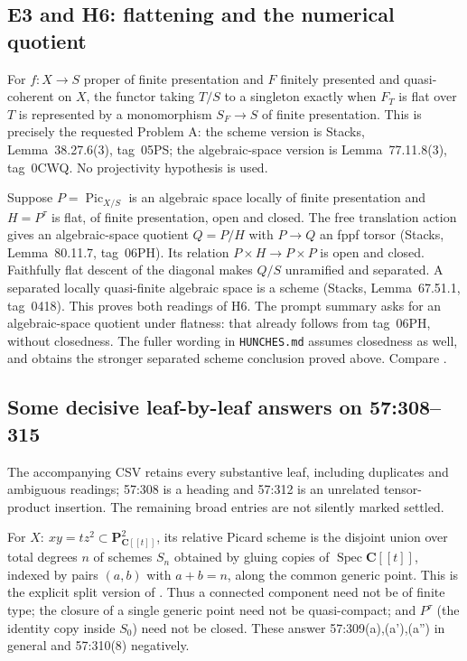\subsection{E3 and H6: flattening and the numerical quotient}

For $f:X\to S$ proper of finite presentation and $F$ finitely presented and
quasi-coherent on $X$, the functor taking $T/S$ to a singleton exactly when
$F_T$ is flat over $T$ is represented by a monomorphism $S_F\to S$ of finite
presentation. This is precisely the requested Problem A: the scheme version
is Stacks, Lemma~38.27.6(3), tag~05PS; the algebraic-space version is
Lemma~77.11.8(3), tag~0CWQ. No projectivity hypothesis is used.

Suppose $P=\operatorname{Pic}_{X/S}$ is an algebraic space locally of finite
presentation and $H=P^\tau$ is flat, of finite presentation, open and closed.
The free translation action gives an algebraic-space quotient $Q=P/H$ with
$P\to Q$ an fppf torsor (Stacks, Lemma~80.11.7, tag~06PH). Its relation
$P\times H\to P\times P$ is open and closed. Faithfully flat descent of the
diagonal makes $Q/S$ unramified and separated. A separated locally
quasi-finite algebraic space is a scheme (Stacks, Lemma~67.51.1, tag~0418).
This proves both readings of H6. The prompt summary asks for an algebraic-space
quotient under flatness: that already follows from tag~06PH, without closedness.
The fuller wording in \texttt{HUNCHES.md} assumes closedness as well, and obtains
the stronger separated scheme conclusion proved above. Compare
\cite[Theorem~3.1]{LaurentSchroer2024}.

\subsection{Some decisive leaf-by-leaf answers on 57:308--315}

The accompanying CSV retains every substantive leaf, including duplicates and
ambiguous readings; 57:308 is a heading and 57:312 is an unrelated tensor-product
insertion. The remaining broad entries are not silently marked settled.

For $X:\ xy=tz^2\subset\mathbf P^2_{\mathbf C[[t]]}$, its relative Picard
scheme is the disjoint union over total degrees $n$ of schemes $S_n$ obtained
by gluing copies of $\operatorname{Spec}\mathbf C[[t]]$, indexed by pairs
$(a,b)$ with $a+b=n$, along the common generic point. This is the explicit
split version of \cite[Example~4.14]{Kleiman2005}. Thus a connected component
need not be of finite type; the closure of a single generic point need not
be quasi-compact; and $P^\tau$ (the identity copy inside $S_0$) need not be
closed. These answer 57:309(a),(a'),(a'') in general and 57:310(8) negatively.

